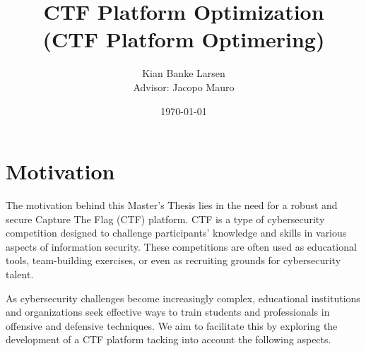 \documentclass[11pt]{article}
\title{CTF Platform Optimization \\[2ex]
       {\large (CTF Platform Optimering)}}
\author{Kian Banke Larsen \\[2ex]
Advisor: Jacopo Mauro}
\date{\today}
\begin{document}
\maketitle

\thispagestyle{empty}

\section*{Motivation}
The motivation behind this Master's Thesis lies in the need for a robust and secure Capture The Flag (CTF) platform. 
CTF is a type of cybersecurity competition designed to challenge participants' knowledge and skills in various aspects of information security. These competitions are often used as educational tools, team-building exercises, or even as recruiting grounds for cybersecurity talent. 

As cybersecurity challenges become increasingly complex, educational institutions and organizations seek effective ways to train students and professionals in offensive and defensive techniques. We aim to facilitate this by exploring the development of a CTF platform tacking into account the following aspects.
\end{document}
